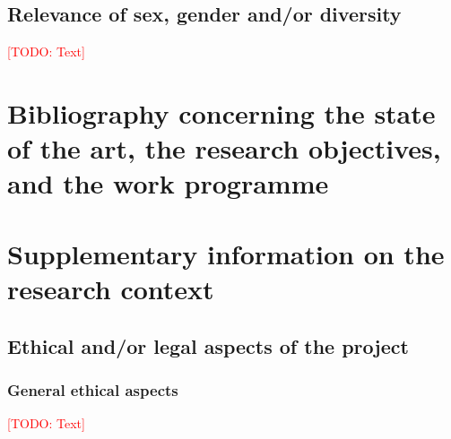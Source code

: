 \documentclass[american,firsttime]{dfgproposal}
\newcommand{\todo}[1]{\xspace{\textcolor{red}{[TODO: #1]}}\xspace}
\begin{document}
	
	\subsection{Relevance of sex, gender and/or diversity}
	\todo{Text}
	
	\section{Bibliography concerning the state of the art, the research objectives, and the work programme}
	\label{sec:bib}
	\newrefcontext
	\printbibliography[notcategory=reviewed, notcategory=nonreviewed, notcategory=patents_pending, notcategory=patents, heading=none]
	
	
	\clearpage
	
	\section{Supplementary information on the research context}
	
	\subsection{Ethical and/or legal aspects of the project}
	
	\subsubsection{General ethical aspects}
	\todo{Text}
	
\end{document}
